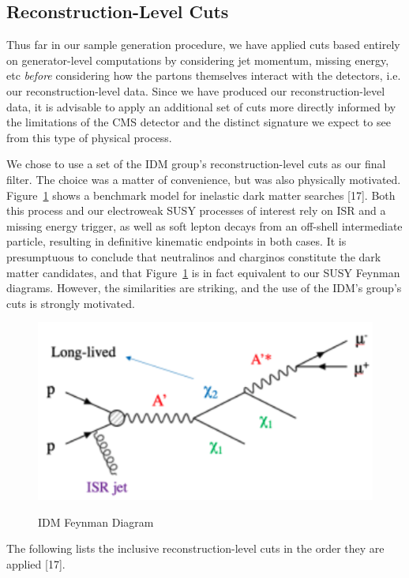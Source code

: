 \documentclass{article}
\begin{document}
\subsection{Reconstruction-Level Cuts}
Thus far in our sample generation procedure, we have applied cuts based entirely on generator-level computations by considering jet momentum, missing energy, etc \textit{before} considering how the partons themselves interact with the detectors, i.e. our reconstruction-level data. Since we have produced our reconstruction-level data, it is advisable to apply an additional set of cuts more directly informed by the limitations of the CMS detector and the distinct signature we expect to see from this type of physical process.
\par
We chose to use a set of the IDM group's reconstruction-level cuts as our final filter. The choice was a matter of convenience, but was also physically motivated. Figure~\ref{fig:8} shows a benchmark model for inelastic dark matter searches [17]. Both this process and our electroweak SUSY processes of interest rely on ISR and a missing energy trigger, as well as soft lepton decays from an off-shell intermediate particle, resulting in definitive kinematic endpoints in both cases. It is presumptuous to conclude that neutralinos and charginos constitute the dark matter candidates, and that Figure~\ref{fig:8} is in fact equivalent to our SUSY Feynman diagrams. However, the similarities are striking, and the use of the IDM's group's cuts is strongly motivated.
\begin{figure}[H]
    \centering
    \caption{IDM Feynman Diagram} 
    \includegraphics[width=12cm]{iDM.png}
    \label{fig:8}
\end{figure}
\par
The following lists the inclusive reconstruction-level cuts in the order they are applied [17].
\end{document}
